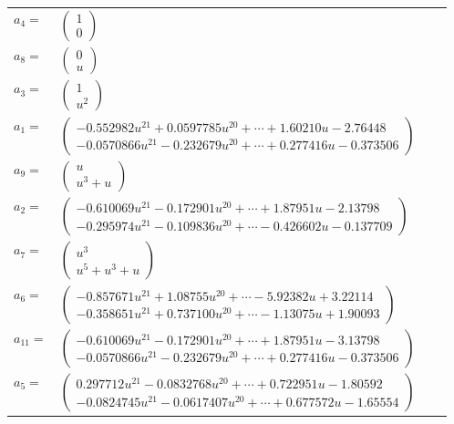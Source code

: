 \documentclass[1p]{elsarticle_modified}
\theoremstyle{definition}
\begin{document}
\begin{tabular}{m{7pt} m{180pt} m{7pt} m{180pt} }
\flushright $a_{4}=$&$\begin{pmatrix}1\\0\end{pmatrix}$ \\
\flushright $a_{8}=$&$\begin{pmatrix}0\\u\end{pmatrix}$ \\
\flushright $a_{3}=$&$\begin{pmatrix}1\\u^2\end{pmatrix}$ \\
\flushright $a_{1}=$&$\begin{pmatrix}-0.552982 u^{21}+0.0597785 u^{20}+\cdots+1.60210 u-2.76448\\-0.0570866 u^{21}-0.232679 u^{20}+\cdots+0.277416 u-0.373506\end{pmatrix}$ \\
\flushright $a_{9}=$&$\begin{pmatrix}u\\u^3+u\end{pmatrix}$ \\
\flushright $a_{2}=$&$\begin{pmatrix}-0.610069 u^{21}-0.172901 u^{20}+\cdots+1.87951 u-2.13798\\-0.295974 u^{21}-0.109836 u^{20}+\cdots-0.426602 u-0.137709\end{pmatrix}$ \\
\flushright $a_{7}=$&$\begin{pmatrix}u^3\\u^5+u^3+u\end{pmatrix}$ \\
\flushright $a_{6}=$&$\begin{pmatrix}-0.857671 u^{21}+1.08755 u^{20}+\cdots-5.92382 u+3.22114\\-0.358651 u^{21}+0.737100 u^{20}+\cdots-1.13075 u+1.90093\end{pmatrix}$ \\
\flushright $a_{11}=$&$\begin{pmatrix}-0.610069 u^{21}-0.172901 u^{20}+\cdots+1.87951 u-3.13798\\-0.0570866 u^{21}-0.232679 u^{20}+\cdots+0.277416 u-0.373506\end{pmatrix}$ \\
\flushright $a_{5}=$&$\begin{pmatrix}0.297712 u^{21}-0.0832768 u^{20}+\cdots+0.722951 u-1.80592\\-0.0824745 u^{21}-0.0617407 u^{20}+\cdots+0.677572 u-1.65554\end{pmatrix}$ \\

\end{tabular}
\end{document}
